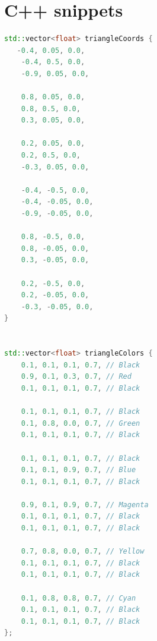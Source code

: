 \documentclass[]{article}
\begin{document}
\section{C++ snippets}
\begin{lstlisting}[language={C++}, caption={Vertices for 6 triangles}, label={lst:6_tris_1}]
std::vector<float> triangleCoords {
   -0.4, 0.05, 0.0,
    -0.4, 0.5, 0.0,
    -0.9, 0.05, 0.0,

    0.8, 0.05, 0.0,
    0.8, 0.5, 0.0,
    0.3, 0.05, 0.0,

    0.2, 0.05, 0.0,
    0.2, 0.5, 0.0,
    -0.3, 0.05, 0.0,

    -0.4, -0.5, 0.0,
    -0.4, -0.05, 0.0,
    -0.9, -0.05, 0.0,

    0.8, -0.5, 0.0,
    0.8, -0.05, 0.0,
    0.3, -0.05, 0.0,

    0.2, -0.5, 0.0,
    0.2, -0.05, 0.0,
    -0.3, -0.05, 0.0,
}


std::vector<float> triangleColors {
    0.1, 0.1, 0.1, 0.7, // Black
    0.9, 0.1, 0.3, 0.7, // Red
    0.1, 0.1, 0.1, 0.7, // Black

    0.1, 0.1, 0.1, 0.7, // Black
    0.1, 0.8, 0.0, 0.7, // Green
    0.1, 0.1, 0.1, 0.7, // Black

    0.1, 0.1, 0.1, 0.7, // Black
    0.1, 0.1, 0.9, 0.7, // Blue
    0.1, 0.1, 0.1, 0.7, // Black

    0.9, 0.1, 0.9, 0.7, // Magenta
    0.1, 0.1, 0.1, 0.7, // Black
    0.1, 0.1, 0.1, 0.7, // Black

    0.7, 0.8, 0.0, 0.7, // Yellow
    0.1, 0.1, 0.1, 0.7, // Black
    0.1, 0.1, 0.1, 0.7, // Black

    0.1, 0.8, 0.8, 0.7, // Cyan
    0.1, 0.1, 0.1, 0.7, // Black
    0.1, 0.1, 0.1, 0.7, // Black
};

\end{lstlisting}
\end{document}
